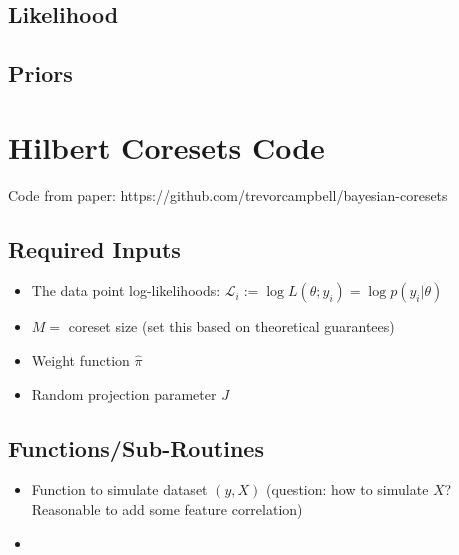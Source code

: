 \documentclass[12pt]{amsart}
\theoremstyle{plain}
\begin{document}
\subsection{Likelihood}
\subsection{Priors}

\section{Hilbert Coresets Code}
Code from paper: https://github.com/trevorcampbell/bayesian-coresets

\subsection{Required Inputs}
\begin{itemize} 
\item The data point log-likelihoods: $\mathcal{L}_i := \log L(\theta; y_i) = \log p(y_i|\theta)$
\item $M = $ coreset size (set this based on theoretical guarantees)
\item Weight function $\hat{\pi}$
\item Random projection parameter $J$
\end{itemize} 

\subsection{Functions/Sub-Routines}
\begin{itemize} 
\item Function to simulate dataset $(y, X)$ (question: how to simulate $X$? Reasonable to add some feature correlation) 
\item 
\end{itemize} 
\end{document}
